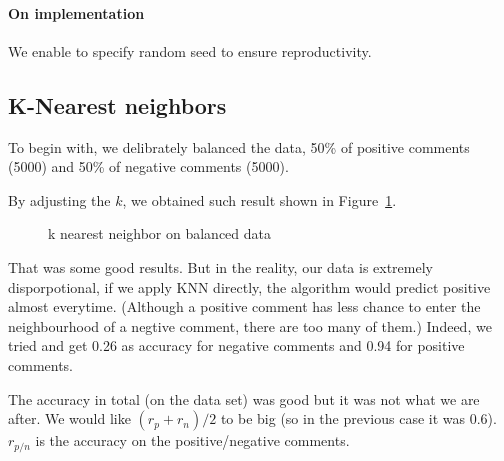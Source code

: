 \documentclass{article}
\begin{document}
\paragraph{On implementation} We enable to specify random seed to ensure reproductivity.

\subsection{K-Nearest neighbors}

To begin with, we delibrately balanced the data, 50\% of positive comments (5000)
and 50\% of negative comments (5000).

By adjusting the $k$, we obtained such result shown in Figure~\ref{fig:KNN1}.

\begin{figure}[H]
  \centering
  \caption{k nearest neighbor on balanced data}
  \label{fig:KNN1}
\end{figure}

That was some good results. But in the reality, our data is extremely disporpotional,
if we apply KNN directly, the algorithm would predict positive almost everytime. (Although
a positive comment has less chance to enter the neighbourhood of a negtive comment,
there are too many of them.) Indeed, we tried and get 0.26 as accuracy for negative comments and 0.94 for
positive comments.

The accuracy in total (on the data set) was good but it was not what we are after. We would like
$(r_p+r_n)/2$ to be big (so in the previous case it was 0.6). $r_{p/n}$ is the accuracy on the positive/negative comments.
\end{document}
